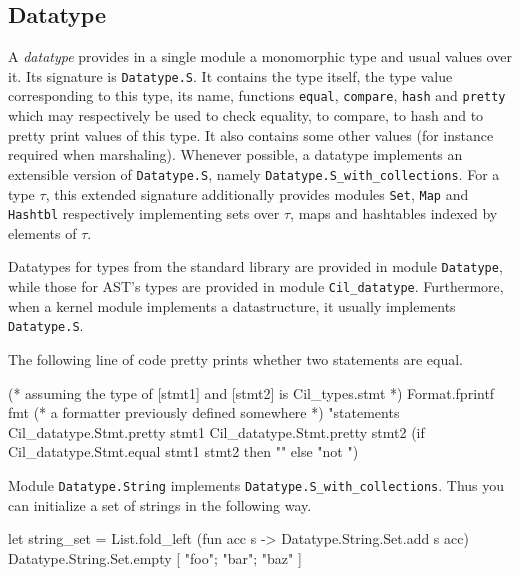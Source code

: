 \subsection{Datatype}\label{type:datatype}

A \emph{datatype} provides in a single module a monomorphic type and usual
values over it. Its signature is \texttt{Datatype.S}. It
contains the type itself, the type value corresponding to this type, its name,
functions \texttt{equal}, \texttt{compare}, \texttt{hash} and \texttt{pretty}
which may respectively be used to check equality, to compare, to hash and to
pretty print values of this type. It also contains some other values (for
instance required when marshaling). Whenever possible, a
datatype implements an extensible version of \texttt{Datatype.S}, namely
\texttt{Datatype.S\_with\_collections}.
For a type $\tau$, this extended signature additionally provides modules
\texttt{Set}, \texttt{Map} and \texttt{Hashtbl} respectively implementing sets
over $\tau$, maps and hashtables indexed by elements of $\tau$.

Datatypes for \caml types from the standard library are provided in module
\texttt{Datatype}, while those for AST's types are provided in
module \texttt{Cil\_datatype}. Furthermore, when a kernel
module implements a datastructure, it usually implements
\texttt{Datatype.S}.

\begin{example}
The following line of code pretty prints whether two statements are equal.
\begin{ocamlcode}
(* assuming the type of [stmt1] and [stmt2] is Cil_types.stmt *)
Format.fprintf
  fmt (* a formatter previously defined somewhere *)
  "statements %
  Cil_datatype.Stmt.pretty stmt1
  Cil_datatype.Stmt.pretty stmt2
  (if Cil_datatype.Stmt.equal stmt1 stmt2 then "" else "not ")
\end{ocamlcode}
\end{example}

\begin{example}
Module \texttt{Datatype.String} implements
\texttt{Datatype.S\_with\_collections}. Thus you can initialize a set of strings
in the following way.
\begin{ocamlcode}
let string_set =
  List.fold_left
    (fun acc s -> Datatype.String.Set.add s acc)
    Datatype.String.Set.empty
    [ "foo"; "bar"; "baz" ]
\end{ocamlcode}
\end{example}

